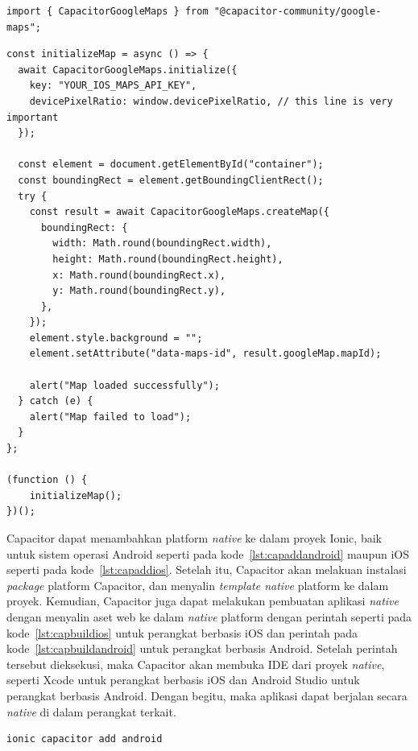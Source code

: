 \begin{enumerate}
\begin{lstlisting}[label={lst:importGmapsPlugin}, caption=Kode untuk Import \textit{Plugin} Google Maps]
import { CapacitorGoogleMaps } from "@capacitor-community/google-maps";
\end{lstlisting}
	
\begin{lstlisting}[label={lst:codeGmapsPlugin}, caption=Contoh Kode Penggunaan \textit{Plugin} Google Maps]
const initializeMap = async () => {
  await CapacitorGoogleMaps.initialize({
    key: "YOUR_IOS_MAPS_API_KEY",
    devicePixelRatio: window.devicePixelRatio, // this line is very important
  });

  const element = document.getElementById("container");
  const boundingRect = element.getBoundingClientRect();
  try {
    const result = await CapacitorGoogleMaps.createMap({
      boundingRect: {
        width: Math.round(boundingRect.width),
        height: Math.round(boundingRect.height),
        x: Math.round(boundingRect.x),
        y: Math.round(boundingRect.y),
      },
    });
    element.style.background = "";
    element.setAttribute("data-maps-id", result.googleMap.mapId);

    alert("Map loaded successfully");
  } catch (e) {
    alert("Map failed to load");
  }
};

(function () {
	initializeMap();
})();
\end{lstlisting}
	
\end{enumerate}

Capacitor dapat menambahkan platform \textit{native} ke dalam proyek Ionic, baik untuk sistem operasi Android seperti pada kode~\ref{lst:capaddandroid} maupun iOS seperti pada kode~\ref{lst:capaddios}. Setelah itu, Capacitor akan melakuan instalasi \textit{package} platform Capacitor, dan menyalin \textit{template native} platform ke dalam proyek. Kemudian, Capacitor juga dapat melakukan pembuatan aplikasi \textit{native} dengan menyalin aset web ke dalam \textit{native} platform dengan perintah seperti pada kode~\ref{lst:capbuildios} untuk perangkat berbasis iOS dan perintah pada kode~\ref{lst:capbuildandroid} untuk perangkat berbasis Android. Setelah perintah tersebut dieksekusi, maka Capacitor akan membuka IDE dari proyek \textit{native}, seperti Xcode untuk perangkat berbasis iOS dan Android Studio untuk perangkat berbasis Android.  Dengan begitu, maka aplikasi dapat berjalan secara \textit{native} di dalam perangkat terkait. 

\begin{lstlisting}[label={lst:capaddandroid}, caption=Kode untuk Menambahkan Platform Android dengan Capacitor]
ionic capacitor add android
\end{lstlisting}

